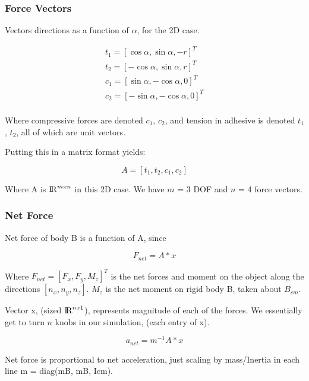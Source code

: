 \documentclass{beamer}
\begin{document}
\frame
{
\frametitle{Force Vectors}

Vectors directions as a function of $\alpha$, for the 2D case.  

\begin{align*}
t_{1} = [\cos{\alpha} , \sin{\alpha}, -r ]^{T}	\\
t_{2} = [-\cos{\alpha} , \sin{\alpha}, r ]^{T}	\\
c_{1} = [\sin{ \alpha } , -\cos{ \alpha }, 0 ]^{T}	\\
c_{2} = [-\sin{ \alpha } , -\cos{ \alpha }, 0 ]^{T}	\\ 
\end{align*}

Where compressive forces are denoted $c_{1}$, $c_{2}$, and tension in adhesive is denoted  $t_{1}$, $t_{2}$, all of which are unit vectors. 

Putting this in a matrix format yields: 

\begin{equation}
A =  [t_{1},  t_{2},  c_{1},  c_{2}]
\end{equation}
	
Where A is ${\rm I\!R} ^{m x n}$ in this 2D case. We have $m$ = 3 DOF and $n$ = 4 force vectors.
}


\frame
{
\frametitle{ Net Force }


Net force of body B is a function of A, since 

\begin{equation}
	F_{net} = A * x
\end{equation}


Where $F_{net} = [F_{x}, F_{y},  M_{z}]^{T}$ is the net forces and moment on the object along the directions $[n_{x}, n_{y}, n_{z}]$.  $M_z$ is the net moment on rigid body B, taken about $B_{cm}$.

Vector x, (sized ${\rm I\!R} ^{n x 1}$), represents magnitude of each of the forces. We essentially get to turn $n$ knobs in our simulation, (each entry of x). 

\begin{equation}
	a_{net} = m^{-1}A * x
\end{equation}

Net force is proportional to net acceleration, just scaling by mass/Inertia in each line m = diag(mB, mB, Icm). 
	
}
\end{document}
